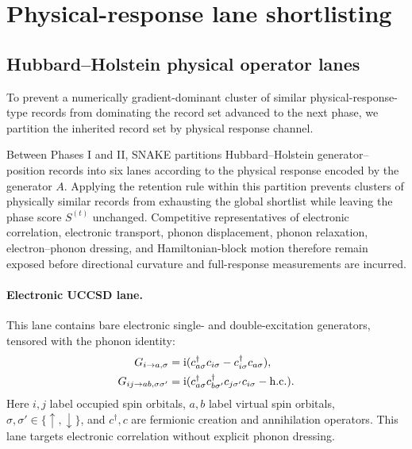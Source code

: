 \documentclass[
  reprint,
  amsmath,
  amssymb,
  aps,
  pra,
  nofootinbib,
  superscriptaddress,
  floatfix
]{revtex4-2}
\newcommand{\ii}{\mathrm{i}}
\begin{document}
\section{Physical-response lane shortlisting}
\label{app:lane_shortlisting}

\subsection{Hubbard--Holstein physical operator lanes}
\label{subsec:hh_physical_operator_lanes}
%
\noindent
To prevent a numerically gradient-dominant cluster of similar physical-response-type records from dominating the record set advanced to the next phase, we partition the inherited record set by physical response channel. 

Between Phases I and II, \textsc{SNAKE} partitions Hubbard--Holstein
generator--position records into six lanes according to the physical response
encoded by the generator \(A\). Applying the retention rule
within this partition prevents clusters of physically similar records from
exhausting the global shortlist while leaving the phase score \(S^{(t)}\)
unchanged. Competitive representatives of electronic correlation, electronic
transport, phonon displacement, phonon relaxation, electron--phonon dressing,
and Hamiltonian-block motion therefore remain exposed before directional
curvature and full-response measurements are incurred.

\paragraph*{Electronic UCCSD lane.}
This lane contains bare electronic single- and double-excitation generators,
tensored with the phonon identity:
\begin{align*}
G_{i\to a,\sigma}
&=
\ii(c_{a\sigma}^{\dagger}c_{i\sigma}
-c_{i\sigma}^{\dagger}c_{a\sigma}),\\
G_{ij\to ab,\sigma\sigma'}
&=
\ii(c_{a\sigma}^{\dagger}c_{b\sigma'}^{\dagger}
c_{j\sigma'}c_{i\sigma}
-{\rm h.c.}) .
\end{align*}
Here \(i,j\) label occupied spin orbitals, \(a,b\) label virtual spin orbitals,
\(\sigma,\sigma'\in\{\uparrow,\downarrow\}\), and \(c^\dagger,c\) are
fermionic creation and annihilation operators. This lane targets electronic
correlation without explicit phonon dressing.
\end{document}
